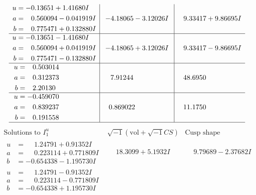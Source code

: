 \documentclass[1p]{elsarticle_modified}
\theoremstyle{definition}
\newcommand{\I}{\sqrt{-1}}
\begin{document}
$$\begin{array}{c|c|c}
\begin{aligned}
u &= -0.13651 + 1.41680 I \\
a &= \phantom{-}0.560094 - 0.041919 I \\
b &= \phantom{-}0.775471 + 0.132880 I\end{aligned}
 & -4.18065 - 3.12026 I & \phantom{-}9.33417 + 9.86695 I \\ \hline\begin{aligned}
u &= -0.13651 - 1.41680 I \\
a &= \phantom{-}0.560094 + 0.041919 I \\
b &= \phantom{-}0.775471 - 0.132880 I\end{aligned}
 & -4.18065 + 3.12026 I & \phantom{-}9.33417 - 9.86695 I \\ \hline\begin{aligned}
u &= \phantom{-}0.503014\phantom{ +0.000000I} \\
a &= \phantom{-}0.312373\phantom{ +0.000000I} \\
b &= \phantom{-}2.20130\phantom{ +0.000000I}\end{aligned}
 & \phantom{-}7.91244\phantom{ +0.000000I} & \phantom{-}48.6950\phantom{ +0.000000I} \\ \hline\begin{aligned}
u &= -0.459070\phantom{ +0.000000I} \\
a &= \phantom{-}0.839237\phantom{ +0.000000I} \\
b &= \phantom{-}0.191558\phantom{ +0.000000I}\end{aligned}
 & \phantom{-}0.869022\phantom{ +0.000000I} & \phantom{-}11.1750\phantom{ +0.000000I}\\
 \hline 
 \end{array}$$\newpage$$\begin{array}{c|c|c}  
\text{Solutions to }I^u_{1}& \I (\text{vol} + \sqrt{-1}CS) & \text{Cusp shape}\\
 \hline 
\begin{aligned}
u &= \phantom{-}1.24791 + 0.91352 I \\
a &= \phantom{-}0.223114 + 0.771809 I \\
b &= -0.654338 - 1.195730 I\end{aligned}
 & \phantom{-}18.3099 + 5.1932 I & \phantom{-}9.79689 - 2.37682 I \\ \hline\begin{aligned}
u &= \phantom{-}1.24791 - 0.91352 I \\
a &= \phantom{-}0.223114 - 0.771809 I \\
b &= -0.654338 + 1.195730 I\end{aligned}

\end{array}$$
\end{document}
